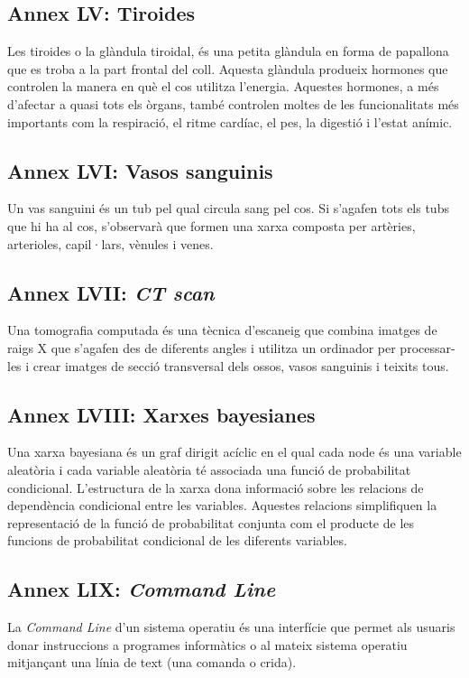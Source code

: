 \documentclass[a4paper,12pt]{article}
\begin{document}
\subsection*{Annex LV: Tiroides}
Les tiroides o la glàndula tiroidal, és una petita glàndula en forma de papallona que es troba a la part frontal del coll. Aquesta glàndula produeix hormones que controlen la manera en què el cos utilitza l'energia. Aquestes hormones, a més d'afectar a quasi tots els òrgans, també controlen moltes de les funcionalitats més importants com la respiració, el ritme cardíac, el pes, la digestió i l'estat anímic.
\subsection*{Annex LVI: Vasos sanguinis}
Un vas sanguini és un tub pel qual circula sang pel cos. Si s'agafen tots els tubs que hi ha al cos, s'observarà que formen una xarxa composta per artèries, arterioles, capil·lars, vènules i venes.
\subsection*{Annex LVII: \textit{CT scan}}
Una tomografia computada és una tècnica d'escaneig que combina imatges de raigs X que s'agafen des de diferents angles i utilitza un ordinador per processar-les i crear imatges de secció transversal dels ossos, vasos sanguinis i teixits tous.
\subsection*{Annex LVIII: Xarxes bayesianes}
Una xarxa bayesiana és un graf dirigit acíclic en el qual cada node és una variable aleatòria i cada variable aleatòria té associada una funció de probabilitat condicional. L'estructura de la xarxa dona informació sobre les relacions de dependència condicional entre les variables. Aquestes relacions simplifiquen la representació de la funció de probabilitat conjunta com el producte de les funcions de probabilitat condicional de les diferents variables.
\subsection*{Annex LIX: \textit{Command Line}}
La \textit{Command Line} d'un sistema operatiu és una interfície que permet als usuaris donar instruccions a programes informàtics o al mateix sistema operatiu mitjançant una línia de text (una comanda o crida).
\end{document}
